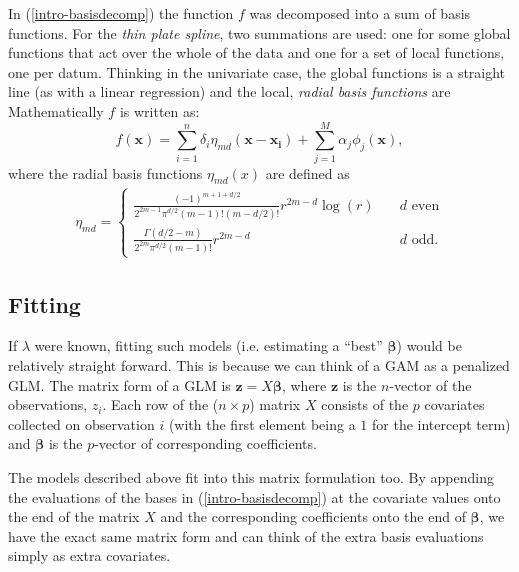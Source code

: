 In (\ref{intro-basisdecomp}) the function $f$ was decomposed into a sum of basis functions. For the \textit{thin plate spline}, two summations are used: one for some global functions that act over the whole of the data and one for a set of local functions, one per datum. Thinking in the univariate case, the global functions is a straight line (as with a linear regression) and the local, \textit{radial basis functions} are  Mathematically $f$ is written as:
\begin{equation}
f(\mathbf{x}) = \sum_{i=1}^n \delta_i \eta_{md}(\mathbf{x}-\mathbf{x_i}) + \sum_{j=1}^M \alpha_j \phi_j(\mathbf{x}),
\label{tprs-basis} 
\end{equation}
where the radial basis functions $\eta_{md}(x)$ are defined as
\begin{align}
\eta_{md} =\begin{cases} \frac{(-1)^{m+1+d/2}}{2^{2m-1}\pi^{d/2}(m-1)!(m-d/2)!} r^{2m-d} \log(r) &\quad{\text{$d$ even}}\\
\frac{\Gamma(d/2-m)}{2^{2m}\pi^{d/2}(m-1)!} r^{2m-d} &\quad{\text{$d$ odd.}}
\end{cases}
\end{align}


\subsection{Fitting}

If $\lambda$ were known, fitting such models (i.e. estimating a ``best'' $\bm{\beta}$) would be relatively straight forward. This is because we can think of a GAM as a penalized GLM. The matrix form of a GLM is $\mathbf{z}=X\bm{\beta}$, where $\mathbf{z}$ is the $n$-vector of the observations, $z_i$. Each row of the ($n\times p$) matrix $X$ consists of the $p$ covariates collected on observation $i$ (with the first element being a $1$ for the intercept term) and $\bm{\beta}$ is the $p$-vector of corresponding coefficients.

The models described above fit into this matrix formulation too. By appending the evaluations of the bases in (\ref{intro-basisdecomp}) at the covariate values onto the end of the matrix $X$ and the corresponding coefficients onto the end of $\bm{\beta}$, we have the exact same matrix form and can think of the extra basis evaluations simply as extra covariates. 

